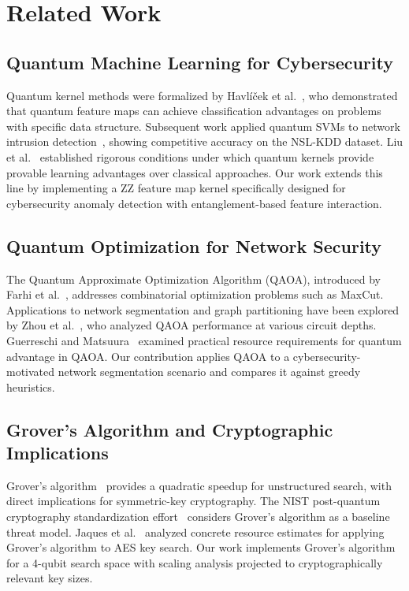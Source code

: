 \documentclass[conference]{IEEEtran}
\begin{document}
\section{Related Work}

\subsection{Quantum Machine Learning for Cybersecurity}

Quantum kernel methods were formalized by Havl\'{i}\v{c}ek et al.~\cite{havlicek2019supervised}, who demonstrated that quantum feature maps can achieve classification advantages on problems with specific data structure. Subsequent work applied quantum SVMs to network intrusion detection~\cite{payares2021quantum}, showing competitive accuracy on the NSL-KDD dataset. Liu et al.~\cite{liu2021rigorous} established rigorous conditions under which quantum kernels provide provable learning advantages over classical approaches. Our work extends this line by implementing a ZZ feature map kernel specifically designed for cybersecurity anomaly detection with entanglement-based feature interaction.

\subsection{Quantum Optimization for Network Security}

The Quantum Approximate Optimization Algorithm (QAOA), introduced by Farhi et al.~\cite{farhi2014quantum}, addresses combinatorial optimization problems such as MaxCut. Applications to network segmentation and graph partitioning have been explored by Zhou et al.~\cite{zhou2020quantum}, who analyzed QAOA performance at various circuit depths. Guerreschi and Matsuura~\cite{guerreschi2019qaoa} examined practical resource requirements for quantum advantage in QAOA. Our contribution applies QAOA to a cybersecurity-motivated network segmentation scenario and compares it against greedy heuristics.

\subsection{Grover's Algorithm and Cryptographic Implications}

Grover's algorithm~\cite{grover1996fast} provides a quadratic speedup for unstructured search, with direct implications for symmetric-key cryptography. The NIST post-quantum cryptography standardization effort~\cite{bernstein2017post} considers Grover's algorithm as a baseline threat model. Jaques et al.~\cite{jaques2020implementing} analyzed concrete resource estimates for applying Grover's algorithm to AES key search. Our work implements Grover's algorithm for a 4-qubit search space with scaling analysis projected to cryptographically relevant key sizes.
\end{document}
